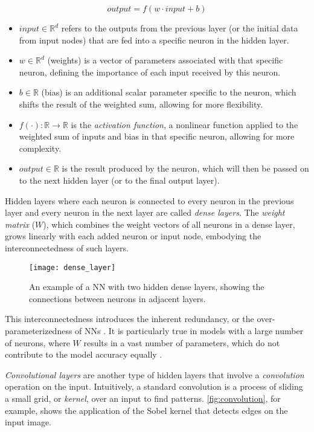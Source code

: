 \[
\textit{output} = f(w \cdot \textit{input} + b)
\]

\begin{itemize}
  \item \( input \in \mathbb{R}^d \) refers to the outputs from the previous layer (or the initial data from input nodes) that are fed into a specific neuron in the hidden layer.
  \item \( w \in \mathbb{R}^d \) (weights) is a vector of parameters associated with that specific neuron, defining the importance of each input received by this neuron. 
  \item \( b \in \mathbb{R} \) (bias) is an additional scalar parameter specific to the neuron, which shifts the result of the weighted sum, allowing for more flexibility.
  \item \( f(\cdot): \mathbb{R} \to \mathbb{R} \) is the \textit{activation function}, a nonlinear function applied to the weighted sum of inputs and bias in that specific neuron, allowing for more complexity.
  \item \( output \in \mathbb{R} \) is the result produced by the neuron, which will then be passed on to the next hidden layer (or to the final output layer).
\end{itemize}

Hidden layers where each neuron is connected to every neuron in the previous layer 
and every neuron in the next layer are called \textit{dense layers}.
The \textit{weight matrix} (\( W\)), which combines the weight vectors of all neurons in a dense layer,
grows linearly with each added neuron or input node, 
embodying the interconnectedness of such layers. 
 
\begin{figure}[t!]
  \centering
  \texttt{[image: dense\_layer]}
  \caption{An example of a NN with two hidden dense layers, showing the connections between neurons in adjacent layers.}
  \label{fig:dense_layer}
\end{figure}

This interconnectedness introduces the inherent redundancy, 
or the over-parameter\-izedness of NNs \cite{gholami2021survey}. It is particularly true in models with a large number of neurons, 
where \( W \) results in a vast number of parameters, which do not contribute to the model accuracy equally \cite{hubara2016qnn}.

\textit{Convolutional layers} are another type of hidden layers 
that involve a \textit{convolution} operation on the input. Intuitively, a standard convolution is 
a process of sliding a small grid, or \textit{kernel}, over an input to find patterns. \cref{fig:convolution}, for example, shows 
the application of the Sobel kernel that detects edges on the input image.

